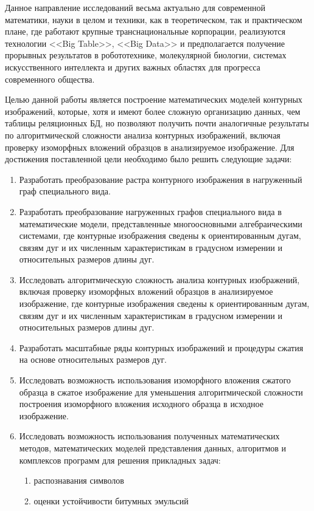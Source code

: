 Данное направление исследований весьма актуально для современной математики, науки в целом и техники, как в теоретическом, так и  практическом плане, где работают крупные транснациональные корпорации, реализуются технологии <<Big Table>>, <<Big Data>> и предполагается получение прорывных результатов в робототехнике, молекулярной биологии, системах искусственного интеллекта и других важных областях для прогресса современного общества.

Целью данной работы является построение математических моделей контурных изображений, которые, хотя и имеют более сложную организацию данных, чем  таблицы реляционных БД, но позволяют получить почти аналогичные результаты по алгоритмической сложности  анализа контурных изображений, включая проверку изоморфных вложений образцов в анализируемое изображение.
Для достижения поставленной цели необходимо было решить следующие задачи:	
\begin{enumerate}
	\item Разработать преобразование растра контурного изображения в нагруженный граф специального вида.
	\item Разработать преобразование нагруженных графов специального вида в математические модели, представленные многоосновными алгебраическими системами, где контурные изображения сведены к ориентированным дугам, связям дуг и их численным характеристикам в градусном измерении и  относительных размеров  длины дуг.
	\item Исследовать алгоритмическую сложность  анализа контурных изображений, включая проверку изоморфных вложений образцов в анализируемое изображение, где контурные изображения сведены к ориентированным дугам, связям дуг и их численным характеристикам в градусном измерении и  относительных размеров  длины дуг.
	\item Разработать  масштабные ряды контурных изображений и процедуры сжатия на  основе относительных размеров дуг.
	\item Исследовать возможность использования  изоморфного вложения сжатого образца в сжатое изображение для уменьшения алгоритмической сложности построения  изоморфного вложения исходного образца в исходное изображение.
	\item Исследовать возможность использования полученных математических методов, математических моделей представления данных, алгоритмов и комплексов программ для решения прикладных задач: 
	\begin{enumerate}
		\item распознавания символов
		\item оценки устойчивости битумных эмульсий
	\end{enumerate}
\end{enumerate}

